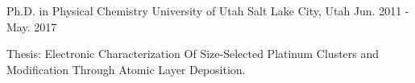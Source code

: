 


\begin{cventries}


\cventry
{Ph.D. in Physical Chemistry}
{University of Utah}
{Salt Lake City, Utah}
{Jun. 2011 - May. 2017}
{
\begin{cvitems}
\item {Thesis: Electronic Characterization Of Size-Selected Platinum Clusters
    and Modification Through Atomic Layer Deposition.}
\end{cvitems}
}


\end{cventries}
